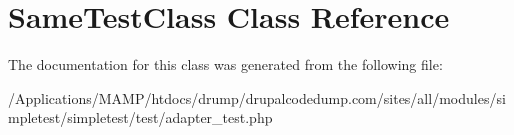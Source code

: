\hypertarget{class_same_test_class}{
\section{SameTestClass Class Reference}
\label{class_same_test_class}
}


The documentation for this class was generated from the following file:\begin{DoxyCompactItemize}
\item 
/Applications/MAMP/htdocs/drump/drupalcodedump.com/sites/all/modules/simpletest/simpletest/test/adapter\_\-test.php\end{DoxyCompactItemize}
